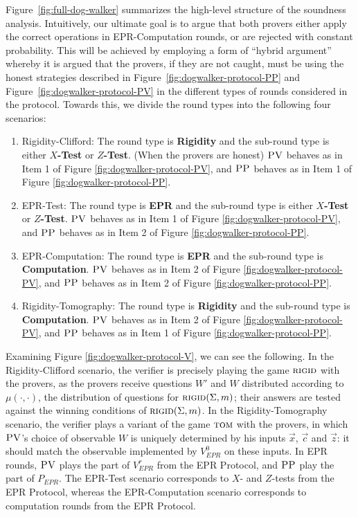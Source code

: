 \documentclass[11pt,letter]{article}
\theoremstyle{remark}
\theoremstyle{definition}
\newcommand{\rigid}{\textsc{rigid}}
\newcommand{\tom}{\textsc{tom}}
\newcommand{\pv}{\textsc{PV}}
\newcommand{\pp}{\textsc{PP}}
\begin{document}
Figure~\ref{fig:full-dog-walker} summarizes the high-level structure of the soundness analysis. Intuitively, our ultimate goal is to argue that both provers either apply the correct operations in EPR-Computation rounds, or are rejected with constant probability. This will be achieved by employing a form of ``hybrid argument'' whereby it is argued that the provers, if they are not caught, must be using the honest strategies described in Figure~\ref{fig:dogwalker-protocol-PP} and Figure~\ref{fig:dogwalker-protocol-PV} in the different types of rounds considered in the protocol. Towards this, we divide the round types into the following four scenarios:
\begin{enumerate}
\item Rigidity-Clifford: The round type is \textbf{Rigidity} and the sub-round type is either \textbf{$X$-Test} or \textbf{$Z$-Test}. (When the provers are honest) $\pv$ behaves as in Item 1 of Figure \ref{fig:dogwalker-protocol-PV}, and $\pp$ behaves as in Item 1 of Figure \ref{fig:dogwalker-protocol-PP}. 
\item EPR-Test: The round type is \textbf{EPR} and the sub-round type is either \textbf{$X$-Test} or \textbf{$Z$-Test}. $\pv$ behaves as  in Item 1 of Figure \ref{fig:dogwalker-protocol-PV}, and $\pp$ behaves as in Item 2 of Figure \ref{fig:dogwalker-protocol-PP}. 
\item EPR-Computation: The round type is \textbf{EPR} and the sub-round type is \textbf{Computation}. $\pv$ behaves as in Item 2 of Figure \ref{fig:dogwalker-protocol-PV}, and $\pp$ behaves as in Item 2 of Figure \ref{fig:dogwalker-protocol-PP}. 
\item Rigidity-Tomography: The round type is \textbf{Rigidity} and the sub-round type is \textbf{Computation}. $\pv$ behaves as in Item 2 of Figure \ref{fig:dogwalker-protocol-PV}, and $\pp$ behaves as in Item 1 of Figure \ref{fig:dogwalker-protocol-PP}. 
\end{enumerate}
Examining Figure \ref{fig:dogwalker-protocol-V}, we can see the following. In the Rigidity-Clifford scenario, the verifier is precisely playing the game $\rigid$ with the provers, as the provers receive questions $W'$ and $W$ distributed according to $\mu(\cdot,\cdot)$, the distribution of questions for $\rigid(\Sigma,m)$; their answers are tested against the winning conditions of $\rigid(\Sigma,m)$. In the Rigidity-Tomography scenario, the verifier plays a variant of the game $\tom$ with the provers, in which $\pv$'s choice of observable $W$ is uniquely determined by his inputs $\vec{x}$, $\vec{c}$ and $\vec{z}$: it should match the observable implemented by $V_{EPR}^0$ on these inputs. In EPR rounds, $\pv$ plays the part of $V_{EPR}^r$ from the EPR Protocol, and $\pp$ play the part of $P_{EPR}$. The EPR-Test scenario corresponds to $X$- and $Z$-tests from the EPR Protocol, whereas the EPR-Computation scenario corresponds to computation rounds from the EPR Protocol.
\end{document}
